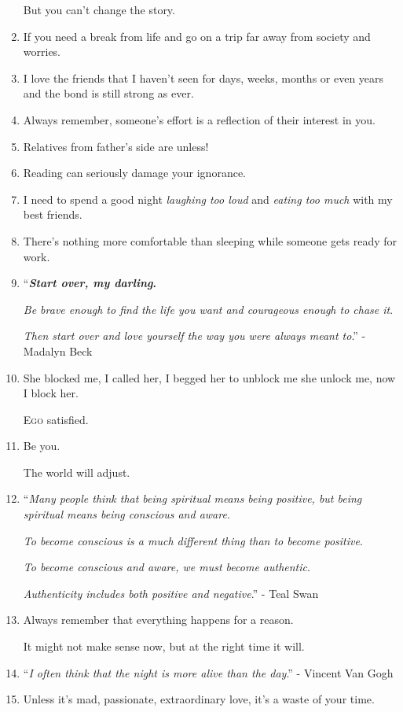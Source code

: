 \documentclass{article}
\begin{document}
\begin{enumerate}
	But you can't change the story.
	\item If you need a break from life and go on a trip far away from society and worries.
	\item I love the friends that I haven't seen for days, weeks, months or even years and the bond is still strong as ever.
	\item Always remember, someone's effort is a reflection of their interest in you.
	\item Relatives from father's side are unless!
	\item Reading can seriously damage your ignorance.
	\item I need to spend a good night \textit{laughing too loud} and \textit{eating too much} with my best friends.
	\item There's nothing more comfortable than sleeping while someone gets ready for work.
	\item ``\textbf{\textit{Start over, my darling}.}
	
	\textit{Be brave enough to find the life you want and courageous enough to chase it}.
	
	\textit{Then start over and love yourself the way you were always meant to}.'' - Madalyn Beck
	\item She blocked me, I called her, I begged her to unblock me she unlock me, now I block her.
	
	\textsc{Ego} satisfied.
	\item Be you.
	
	The world will adjust.
	\item ``\textit{Many people think that being spiritual means being positive, but being spiritual means being conscious and aware}.
	
	\textit{To become conscious is a much different thing than to become positive}.
	
	\textit{To become conscious and aware, we must become authentic}.
	
	\textit{Authenticity includes both positive and negative}.'' - Teal Swan
	\item Always remember that everything happens for a reason.
	
	It might not make sense now, but at the right time it will.
	\item ``\textit{I often think that the night is more alive than the day}.'' - Vincent Van Gogh
	\item Unless it's mad, passionate, extraordinary love, it's a waste of your time.
	

\end{enumerate}
\end{document}
